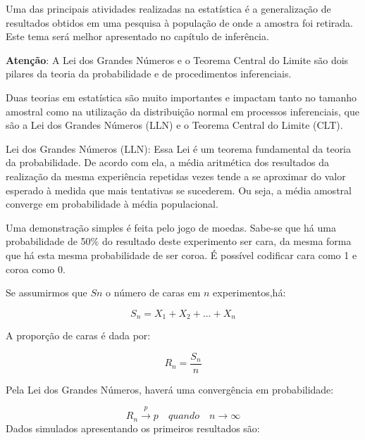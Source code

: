 \documentclass[
]{book}
\newenvironment{Shaded}{\begin{snugshade}}{\end{snugshade}}
\newcommand{\KeywordTok}[1]{\textcolor[rgb]{0.13,0.29,0.53}{\textbf{#1}}}
\newcommand{\NormalTok}[1]{#1}
\newcommand{\OperatorTok}[1]{\textcolor[rgb]{0.81,0.36,0.00}{\textbf{#1}}}
\newcommand{\StringTok}[1]{\textcolor[rgb]{0.31,0.60,0.02}{#1}}
\begin{document}
Uma das principais atividades realizadas na estatística é a
generalização de resultados obtidos em uma pesquisa à população de onde
a amostra foi retirada. Este tema será melhor apresentado no capítulo de
inferência.

\begin{warning}

\textbf{Atenção}: A Lei dos Grandes Números e o Teorema Central do
Limite são dois pilares da teoria da probabilidade e de procedimentos
inferenciais.

\end{warning}

Duas teorias em estatística são muito importantes e impactam tanto no
tamanho amostral como na utilização da distribuição normal em processos
inferenciais, que são a Lei dos Grandes Números (LLN) e o Teorema
Central do Limite (CLT).

Lei dos Grandes Números (LLN): Essa Lei é um teorema fundamental da
teoria da probabilidade. De acordo com ela, a média aritmética dos
resultados da realização da mesma experiência repetidas vezes tende a se
aproximar do valor esperado à medida que mais tentativas se sucederem.
Ou seja, a média amostral converge em probabilidade à média
populacional.

Uma demonstração simples é feita pelo jogo de moedas. Sabe-se que há uma
probabilidade de 50\% do resultado deste experimento ser cara, da mesma
forma que há esta mesma probabilidade de ser coroa. É possível codificar
cara como 1 e coroa como 0.

Se assumirmos que \(Sn\) o número de caras em \(n\) experimentos,há:

\[S_n = X_1 + X_2 + \dots + X_n\]

A proporção de caras é dada por:

\[R_n = \frac{S_n}{n}\]

Pela Lei dos Grandes Números, haverá uma convergência em probabilidade:

\[R_n \overset{p}{\to} p\quad quando \quad n \rightarrow \infty \] Dados
simulados apresentando os primeiros resultados são:

\begin{Shaded}
\end{Shaded}
\end{document}
